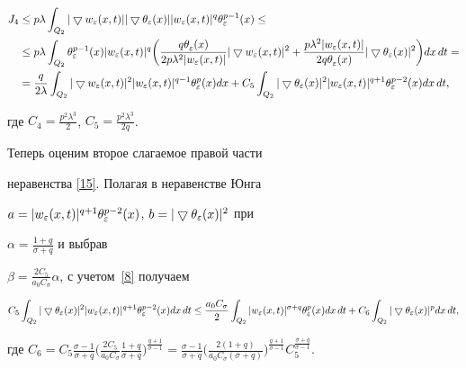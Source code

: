 \begin{pf}
\begin{align}
%


J_4 &\le p\lambda \int_{Q_2}\mgrad \tgrad |w_\eps(x,t)|^q \tmd{p-1}\le \notag\\


&\le p\lambda \int_{Q_2} \tmd{p-1}|w_\eps(x,t)|^q\bigg(


\frac{q\tm}{2p\lambda^2|w_\eps(x,t)|}\mgrad^2


+\frac{p\lambda^2|w_\eps(x,t)|}{2q\tm}\tgrad^2\bigg)dx\,dt = \notag\\


%


&=\frac{q}{2\lambda}\int_{Q_2}


\mgrad^2|w_\eps(x,t)|^{q-1}\tmp dx +C_5


\int_{Q_2}\tgrad^2|w_\eps(x,t)|^{q+1}\tmd{p-2} dx\,dt,


\label{15}


\end{align}


где $C_4=\frac{p^2\lambda^3}2$, $C_5=\frac{p^2\lambda^3}{2q}$.





Теперь оценим второе слагаемое правой части


неравенства \eqref{15}. Полагая в неравенстве Юнга


$a=|w_\varepsilon(x,t)|^{q+1}\theta_\varepsilon^{p-2}(x)$, $b=|\bigtriangledown\theta_\varepsilon(x)|^2$ при


$\alpha=\frac{1+q}{\sigma+q}$ и выбрав


$\beta=\frac{2C_5}{a_0C_\sigma}\alpha$, с учетом~\eqref{8} получаем


\begin{equation}


C_5 \int_{Q_2} \tgrad^2 |w_\eps(x,t)|^{q+1} \tmd{p-2} dx\,dt \le 


%


\frac{a_0C_\sigma}{2}\int_{Q_2}|w_\eps(x,t)|^{\sigma+q}\tmp


dx\,dt+ C_6\int_{Q_2}\tgrad^{p} dx\,dt, \label{16}


\end{equation}


где $C_6=C_5\frac{\sigma-1}{\sigma+q}


\big(\frac{2C_5}{a_0C_\sigma}\frac{1+q}{\sigma+q}\big)^


{\frac{q+1}{\sigma-1}}=\frac{\sigma-1}{\sigma+q}


\big(\frac{2(1+q)}{a_0C_\sigma(\sigma+q)}\big)^


{\frac{q+1}{\sigma-1}}C_5^{\frac{\sigma+q}{\sigma-1}}$.






\end{pf}
